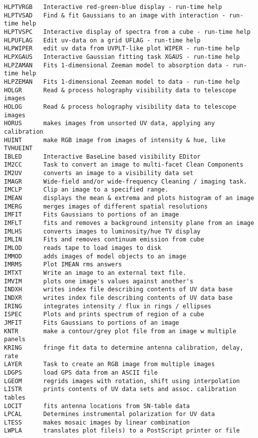\begin{verbatim}
HLPTVRGB   Interactive red-green-blue display - run-time help
HLPTVSAD   Find & fit Gaussians to an image with interaction - run-time help
HLPTVSPC   Interactive display of spectra from a cube - run-time help
HLPUFLAG   Edit uv-data on a grid UFLAG - run-time help
HLPWIPER   edit uv data from UVPLT-like plot WIPER - run-time help
HLPXGAUS   Interactive Gaussian fitting task XGAUS - run-time help
HLPZAMAN   Fits 1-dimensional Zeeman model to absorption data - run-time help
HLPZEMAN   Fits 1-dimensional Zeeman model to data - run-time help
HOLGR      Read & process holography visibility data to telescope images
HOLOG      Read & process holography visibility data to telescope images
HORUS      makes images from unsorted UV data, applying any calibration
HUINT      make RGB image from images of intensity & hue, like TVHUEINT
IBLED      Interactive BaseLine based visibility EDitor
IM2CC      Task to convert an image to multi-facet Clean Components
IM2UV      converts an image to a visibility data set
IMAGR      Wide-field and/or wide-frequency Cleaning / imaging task.
IMCLP      Clip an image to a specified range.
IMEAN      displays the mean & extrema and plots histogram of an image
IMERG      merges images of different spatial resolutions
IMFIT      Fits Gaussians to portions of an image
IMFLT      fits and removes a background intensity plane from an image
IMLHS      converts images to luminosity/hue TV display
IMLIN      Fits and removes continuum emission from cube
IMLOD      reads tape to load images to disk
IMMOD      adds images of model objects to an image
IMRMS      Plot IMEAN rms answers
IMTXT      Write an image to an external text file.
IMVIM      plots one image's values against another's
INDXH      writes index file describing contents of UV data base
INDXR      writes index file describing contents of UV data base
IRING      integrates intensity / flux in rings / ellipses
ISPEC      Plots and prints spectrum of region of a cube
JMFIT      Fits Gaussians to portions of an image
KNTR       make a contour/grey plot file from an image w multiple panels
KRING      fringe fit data to determine antenna calibration, delay, rate
LAYER      Task to create an RGB image from multiple images
LDGPS      load GPS data from an ASCII file
LGEOM      regrids images with rotation, shift using interpolation
LISTR      prints contents of UV data sets and assoc. calibration tables
LOCIT      fits antenna locations from SN-table data
LPCAL      Determines instrumental polarization for UV data
LTESS      makes mosaic images by linear combination
LWPLA      translates plot file(s) to a PostScript printer or file

\end{verbatim}
